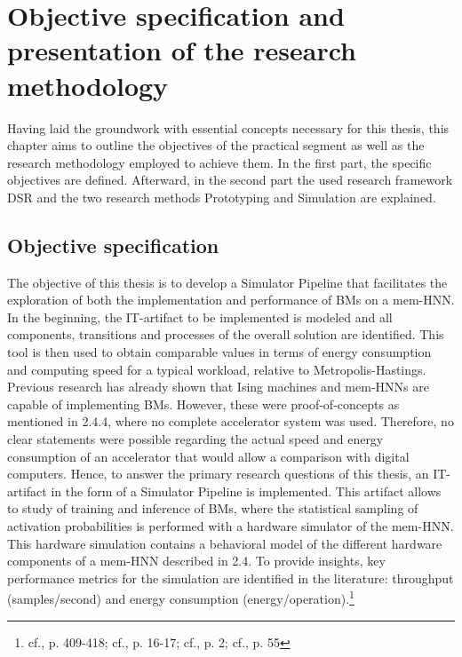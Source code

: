 \chapter{Objective specification and presentation of the research methodology}

Having laid the groundwork with essential concepts necessary for this thesis,
this chapter aims to outline the objectives of the practical segment as well as the research methodology employed to achieve them.
In the first part, the specific objectives are defined. 
Afterward, in the second part the used research framework \ac{DSR} and the two research methods Prototyping and Simulation are explained.

\section{Objective specification}
The objective of this thesis is to develop a Simulator Pipeline that facilitates the exploration of both the implementation and performance of \ac{BM}s on a \ac{mem-HNN}.
In the beginning, the \ac{IT}-artifact to be implemented is modeled and all components, transitions and processes of the overall solution are identified.
This tool is then used to obtain comparable values in terms of energy consumption and computing speed for a typical workload, relative to Metropolis-Hastings.
Previous research has already shown that Ising machines and \ac{mem-HNN}s are capable of implementing \ac{BM}s.
However, these were proof-of-concepts as mentioned in 2.4.4, where no complete accelerator system was used.
Therefore, no clear statements were possible regarding the actual speed and energy consumption of an accelerator that would allow a comparison with digital computers.
Hence, to answer the primary research questions of this thesis, an \ac{IT}-artifact in the form of a Simulator Pipeline is implemented.
This artifact allows to study of training and inference of \ac{BM}s, where the statistical sampling of activation probabilities is performed with a hardware simulator of the \ac{mem-HNN}.
This hardware simulation contains a behavioral model of the different hardware components of a \ac{mem-HNN} described in 2.4.
To provide insights, key performance metrics for the simulation are identified in the literature: throughput (samples/second) and energy consumption (energy/operation).\footnote{cf.\cite{caiPowerefficientCombinatorialOptimization2020}, p. 409-418; cf.\cite{ortega-zamoranoFPGAHardwareAcceleration2016}, p. 16-17; cf.\cite{aaditAcceleratingAdaptiveParallel2023}, p. 2; cf.\cite{bellettiJanusFPGABasedSystem2009}, p. 55}

